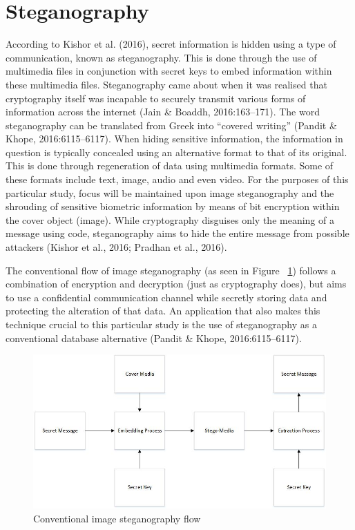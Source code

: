 \section[Steganography]{Steganography}
According to Kishor et al. (2016), secret information is hidden using a type of communication, known as steganography. This is done through the use of multimedia files in conjunction with secret keys to embed information within these multimedia files. Steganography came about when it was realised that cryptography itself was incapable to securely transmit various forms of information across the internet (Jain \& Boaddh, 2016:163–171). The word steganography can be translated from Greek into “covered writing” (Pandit \& Khope, 2016:6115–6117). When hiding sensitive information, the information in question is typically concealed using an alternative format to that of its original. This is done through regeneration of data using multimedia formats. Some of these formats include text, image, audio and even video. For the purposes of this particular study, focus will be maintained upon image steganography and the shrouding of sensitive biometric information by means of bit encryption within the cover object (image). While cryptography disguises only the meaning of a message using code, steganography aims to hide the entire message from possible attackers (Kishor et al., 2016; Pradhan et al., 2016).

The conventional flow of image steganography (as seen in Figure ~\ref{fig:Conventional image steganography flow}) follows a combination of encryption and decryption (just as cryptography does), but aims to use a confidential communication channel while secretly storing data and protecting the alteration of that data. An application that also makes this technique crucial to this particular study is the use of steganography as a conventional database alternative (Pandit \& Khope, 2016:6115–6117).


  
\begin{figure}[htbp!] 
\centering    
\includegraphics[width=1.0\textwidth]{Chapter2/Figs/Conventional_image_steganography_flow.jpg}
\caption[Conventional image steganography flow]{Conventional image steganography flow}
\label{fig:Conventional image steganography flow}
\end{figure}

